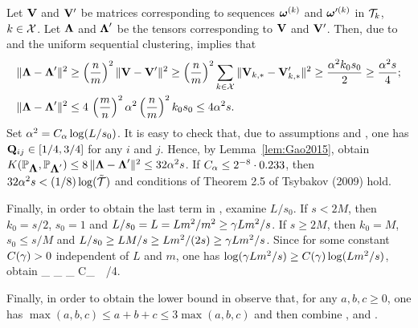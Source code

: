 Let $\mathbf{V}$ and $\mathbf{V}'$ be matrices corresponding to sequences $\bom^{(k)}$ and $\bom'^{(k)}$  
in ${\cal T}_k$, $k \in {\cal{X}}$. Let $\bLam$ and $\bLam'$ be the tensors corresponding to $\mathbf{V}$ and $\mathbf{V}'$.
Then, due to  and the uniform sequential clustering,    implies that 
\begin{align*} 
\|\bLam - \bLam'\|^2 
& \geq   \lkr \frac{n}{m}\rkr^2 \|\bV - \bV'\|^2 
\geq   \lkr \frac{n}{m}\rkr^2 \sum_{k \in \calX} \|\bV_{k,*} - \bV'_{k,*}\|^2  
  \geq   \frac{\al^2  k_0 s_0}{2} \geq  \frac{\al^2  s}{4};\\
\|\bLam - \bLam'\|^2 & \leq    4\, \lkr \frac{m}{n}\rkr^2 \al^2 \lkr \frac{n}{m}\rkr^2 k_0 s_0 \leq 4 \al^2 s.
\end{align*}
Set $\alpha^2 = C_\alpha \log (L/s_0)$.    It is easy to check that, due  to assumptions  and ,
one has $\mathbf{Q}_{ij} \in [1/4,3/4]$ for any $i$ and $j$. Hence,   by Lemma~\ref{lem:Gao2015}, obtain
$K (\PP_{\bLam}, \PP_{\bLam'}) \leq 8\, \| \bLam - \bLam'\|^2  \leq 32 \al^2 s$. 
 If $C_\alpha \leq 2^{-8} \cdot 0.233$, then $32 \alpha^2 s < (1/8) \log(\tilde{{\cal T}})$ and 
conditions of Theorem 2.5 of Tsybakov (2009) hold.  


Finally, in order to obtain the last term in , examine $L/s_0$.
If $s < 2M$, then $k_0 = s/2$, $s_0=1$ and  $L/s_0 = L = L m^2/m^2 \geq \gamma L m^2/s$.
If $s \geq 2M$, then $k_0 = M$, $s_0\leq s/M$ and $L/s_0 \geq LM/s \geq Lm^2/(2s) \geq \gamma L m^2/s$. 
Since for some constant $C(\gamma)>0$ independent of $L$ and $m$, one has $\log (\gamma L m^2/s) \geq C(\gamma) \log(L m^2/s)$, obtain
\be \label{lower_DSBM3}
\inf_{\hbLam} \sup_{}
\PP_{\bLam} \lfi {} \geq   C_\ga \,   \,\log \lkr {} \rkr
 \rfi {}/4.
\ee
 


Finally, in order to obtain the lower bound in  observe that, for any $a,b,c \geq 0$, 
one has $\max(a,b,c)\leq a+b+c \leq 3 \max(a,b,c)$     and then combine
,  and .
\\ 
 
 



